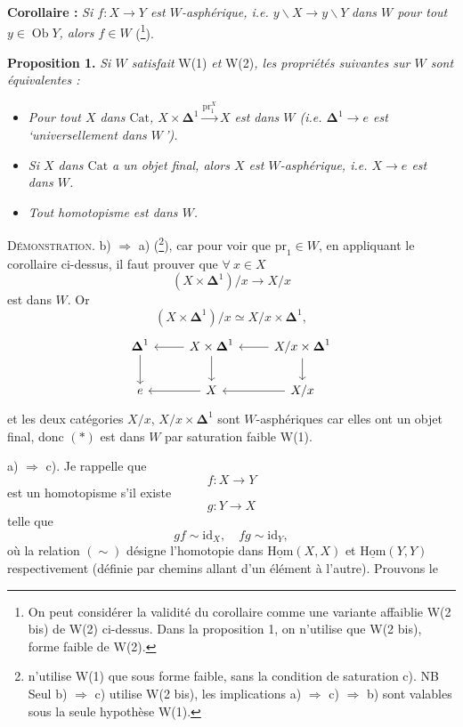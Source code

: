 \documentclass[11pt]{article}
\newcommand{\printedpage}[1]{\marginpar{\footnotesize p.~#1}}
\newcommand{\msp}[1]{\marginpar{\footnotesize [#1]}}
\newcommand{\Cat}{\mathrm{Cat}}
\newcommand{\Ob}{\operatorname{Ob}}
\newcommand{\Dl}{\boldsymbol{\Delta}}
\newcommand{\fl}{\longrightarrow}
\newcommand{\uHom}{\underline{\mathrm{Hom}}}
\newcommand{\id}{\mathrm{id}}
\newcommand{\pr}{\mathrm{pr}}
\begin{document}
\textbf{Corollaire :} \textit{Si $f : X \fl Y$ est $W$-asphérique, i.e. $y\backslash X \fl y\backslash Y$} \textit{dans $W$ pour tout $y \in \Ob Y$, alors $f \in W$} (\footnote{On peut considérer la validité du corollaire comme une variante affaiblie W(2 bis) de W(2) ci-dessus. Dans la proposition 1, on n'utilise que W(2 bis), forme faible de W(2).}).

\textbf{Proposition 1.} \textit{Si $W$ satisfait} W(1) \textit{et} W(2)\textit{, les propriétés suivantes sur $W$ sont équivalentes :}

\begin{itemize}[leftmargin=*]
\item[\textit{a)}] \textit{Pour tout $X$ dans $\Cat$, $X \times \Dl^1 \xrightarrow{\pr_1^X} X$ est dans $W$ (i.e. $\Dl^1 \fl e$ est `universellement dans $W$\,').}

\item[\textit{b)}] \textit{Si $X$ dans $\Cat$ a un objet final, alors $X$ est $W$-asphérique, i.e. $X \fl e$ est dans $W$.}

\item[\textit{c)}] \textit{Tout homotopisme est dans $W$.}
\end{itemize}

\clearpage

\printedpage{2}

\textsc{Démonstration.} b) $\Longrightarrow$ a) (\footnote{n'utilise W(1) que sous forme faible, sans la condition de saturation c). NB Seul b) $\Longrightarrow$ c) utilise W(2 bis), les implications a) $\Longrightarrow$ c) $\Longrightarrow$ b) sont valables sous la seule hypothèse W(1).}), car pour voir que $\pr_1 \in W$, en appliquant le corollaire ci-dessus, il faut prouver que $\forall\ x \in X$
\[ (X \times \Dl^1)/x \fl X/x \tag*{$(*)$} \]
est dans $W$. Or
\[ (X \times \Dl^1)/x \simeq X/x \times \Dl^1, \]
\[
\begin{tikzcd}
\Dl^1 \arrow[d] & X \times \Dl^1 \arrow[l] \arrow[d] & X/x \times \Dl^1 \arrow[l] \arrow[d] \\
e & X \arrow[l] & X/x \arrow[l]
\end{tikzcd}
\]
 et les deux catégories $X/x$, $X/x \times \Dl^1$ sont $W$-asphériques car elles ont un objet final, donc $(*)$ est dans $W$ par saturation faible W(1).

a) $\Longrightarrow$ c). Je rappelle que
\[ f : X \fl Y \]
\msp{page 2}
est un homotopisme s'il existe
\[ g : Y \fl X \]
telle que
\[ gf \sim \id_X, \quad fg \sim \id_Y, \tag*{$(*)$} \]
où la relation $(\sim)$ désigne l'homotopie dans $\uHom(X,X)$ et $\uHom(Y,Y)$ respectivement (définie par chemins allant d'un élément à l'autre). Prouvons le
\end{document}
